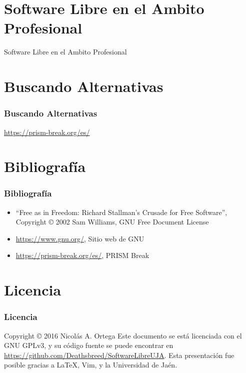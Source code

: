 \documentclass[xetex]{beamer}
\begin{document}

\section{Software Libre en el Ambito Profesional}
\begin{frame}
    \centering \Huge Software Libre en el Ambito Profesional
\end{frame}


\section{Buscando Alternativas}
\begin{frame}
    \frametitle{Buscando Alternativas}
    \centering \Large \url{https://prism-break.org/es/}
\end{frame}


\section{Bibliografía}
\begin{frame}[t]
    \frametitle{Bibliografía}
    \begin{itemize}
        \item ``Free as in Freedom: Richard Stallman's Crusade for Free Software'', Copyright \copyright{} 2002 Sam Williams, GNU Free Document License
        \item \url{https://www.gnu.org/}, Sitio web de GNU
        \item \url{https://prism-break.org/es/}, PRISM Break
    \end{itemize}
\end{frame}


\section{Licencia}
\begin{frame}
    \frametitle{Licencia}
    Copyright \copyright{} 2016 Nicolás A. Ortega
    \linebreak{}
    \linebreak{}
    Este documento se está licenciada con el GNU GPLv3, y su código fuente se puede encontrar en \url{https://github.com/Deathsbreed/SoftwareLibreUJA}.
    \linebreak{}
    \linebreak{}
    Esta presentación fue posible gracias a \LaTeX, Vim, y la Universidad de Jaén.
\end{frame}
\end{document}

